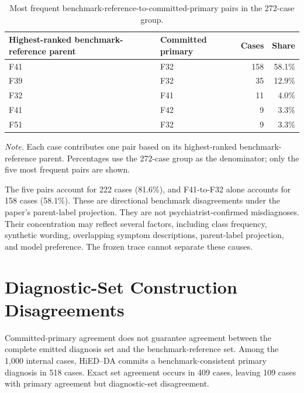 \begin{table}[htbp]
\centering
\caption{Most frequent benchmark-reference-to-committed-primary pairs in the 272-case group.}
\label{tab:ch8-selection-pairs}
\small
\begin{tabularx}{\textwidth}{|>{\raggedright\arraybackslash}X|>{\raggedright\arraybackslash}p{3.2cm}|r|r|}
\hline
Highest-ranked benchmark-reference parent & Committed primary & Cases & Share\\
\hline
F41 & F32 & 158 & 58.1\%\\
F39 & F32 & 35 & 12.9\%\\
F32 & F41 & 11 & 4.0\%\\
F41 & F42 & 9 & 3.3\%\\
F51 & F32 & 9 & 3.3\%\\
\hline
\end{tabularx}
\parbox{0.96\textwidth}{\footnotesize
\textit{Note.} Each case contributes one pair based on its highest-ranked benchmark-reference parent. Percentages use the 272-case group as the denominator; only the five most frequent pairs are shown.}
\end{table}

The five pairs account for 222 cases (81.6\%), and F41-to-F32 alone accounts for 158 cases (58.1\%). These are directional benchmark disagreements under the paper's parent-label projection. They are not psychiatrist-confirmed misdiagnoses. Their concentration may reflect several factors, including class frequency, synthetic wording, overlapping symptom descriptions, parent-label projection, and model preference. The frozen trace cannot separate these causes.

\section{Diagnostic-Set Construction Disagreements}
\label{sec:ch8-diagnostic-set}

Committed-primary agreement does not guarantee agreement between the complete emitted diagnosis set and the benchmark-reference set. Among the 1,000 internal cases, HiED--DA commits a benchmark-consistent primary diagnosis in 518 cases. Exact set agreement occurs in 409 cases, leaving 109 cases with primary agreement but diagnostic-set disagreement.

